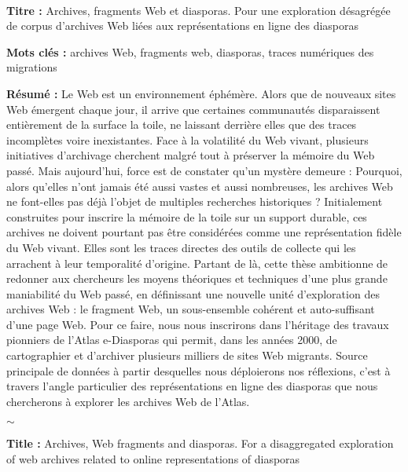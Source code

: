 \documentclass[symmetric,justified,marginals=raggedouter]{tufte-book}
\newcommand{\blankpage}{\newpage\hbox{}\thispagestyle{empty}\newpage}
\begin{document}
\blankpage

  
\newpage

~\vfill

\begin{fullwidth}
\thispagestyle{empty}
\setlength{\parskip}{\baselineskip}

\noindent\textbf{Titre :} Archives, fragments Web et diasporas. Pour une exploration désagrégée de corpus d'archives Web liées aux représentations en ligne des diasporas 

\noindent\textbf{Mots clés :} archives Web, fragments web, diasporas, traces numériques des migrations 

\noindent\textbf{Résumé :} Le Web est un environnement éphémère. Alors que de nouveaux sites Web émergent chaque jour, il arrive que certaines communautés disparaissent entièrement de la surface la toile, ne laissant derrière elles que des traces incomplètes voire inexistantes. Face à la volatilité du Web vivant, plusieurs initiatives d'archivage cherchent malgré tout à préserver la mémoire du Web passé. Mais aujourd'hui, force est de constater qu'un mystère demeure : Pourquoi, alors qu'elles n'ont jamais été aussi vastes et aussi nombreuses, les archives Web ne font-elles pas déjà l'objet de multiples recherches historiques ? Initialement construites pour inscrire la mémoire de la toile sur un support durable, ces archives ne doivent pourtant pas être considérées comme une représentation fidèle du Web vivant. Elles sont les traces directes des outils de collecte qui les arrachent à leur temporalité d'origine. Partant de là, cette thèse ambitionne de redonner aux chercheurs les moyens théoriques et techniques d'une plus grande maniabilité du Web passé, en définissant une nouvelle unité d'exploration des archives Web : le fragment Web, un sous-ensemble cohérent et auto-suffisant d'une page Web. Pour ce faire, nous nous inscrirons dans l'héritage des travaux pionniers de l'Atlas e-Diasporas qui permit, dans les années 2000, de cartographier et d'archiver plusieurs milliers de sites Web migrants. Source principale de données à partir desquelles nous déploierons nos réflexions, c'est à travers l'angle particulier des représentations en ligne des diasporas que nous chercherons à explorer les archives Web de l'Atlas.

\hspace*{21.5em}$\sim$

\noindent\textbf{Title :} Archives, Web fragments and diasporas. For a disaggregated exploration of web archives related to online representations of diasporas


\end{fullwidth}
\end{document}
